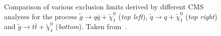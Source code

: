 \begin{figure}[!t]
  \centering
{}

  \caption{Comparison of various exclusion limits derived by different CMS analyses for the process $\tilde{g} \rightarrow q\bar{q} + \tilde{\chi}_1^0$ (\textit{top left}), $\tilde{q} \rightarrow q + \tilde{\chi}_1^0$ (\textit{top right}) and $\tilde{g} \rightarrow t\bar{t} + \tilde{\chi}_1^0$ (\textit{bottom}). Taken from~\cite{bib:CMS:PhysicsResultsSUS}.}
  \label{fig:result_comp} 
\end{figure}
